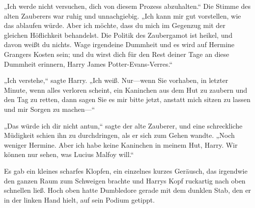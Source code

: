 \begin{em}
„Ich werde nicht versuchen, dich von diesem Prozess abzuhalten.“
Die Stimme des alten Zauberers war ruhig und unnachgiebig.
„Ich kann mir gut vorstellen, wie das ablaufen würde. Aber ich möchte, dass du mich im Gegenzug mit der gleichen Höflichkeit behandelst. Die Politik des Zaubergamot ist heikel, und davon weißt du nichts. Wage irgendeine Dummheit und es wird auf Hermine Grangers Kosten sein; und du wirst dich für den Rest deiner Tage an diese Dummheit erinnern, Harry James Potter-Evans-Verres.“

„Ich verstehe,“ sagte Harry. „Ich weiß. Nur—wenn Sie vorhaben, in letzter Minute, wenn alles verloren scheint, ein Kaninchen aus dem Hut zu zaubern und den Tag zu retten, dann sagen Sie es mir bitte jetzt, anstatt mich sitzen zu lassen und mir Sorgen zu machen—“

„Das würde ich dir nicht antun,“ sagte der alte Zauberer, und eine schreckliche Müdigkeit schien ihn zu durchdringen, als er sich zum Gehen wandte. „Noch weniger Hermine. Aber ich habe keine Kaninchen in meinem Hut, Harry. Wir können nur sehen, was Lucius Malfoy will.“
\end{em}

Es gab ein kleines scharfes Klopfen, ein einzelnes kurzes Geräusch, das irgendwie den ganzen Raum zum Schweigen brachte und Harrys Kopf ruckartig nach oben schnellen ließ. Hoch oben hatte Dumbledore gerade mit dem dunklen Stab, den er in der linken Hand hielt, auf sein Podium getippt.


